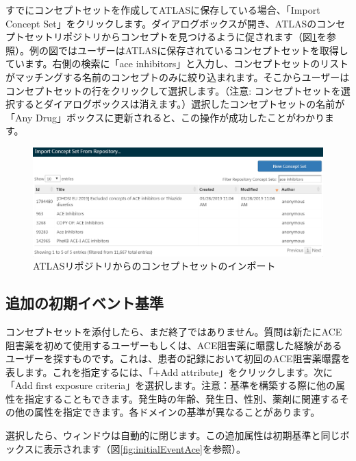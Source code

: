 \documentclass[
  11pt]{book}
\theoremstyle{definition}
\theoremstyle{definition}
\theoremstyle{definition}
\theoremstyle{definition}
\theoremstyle{remark}
\begin{document}
すでにコンセプトセットを作成してATLASに保存している場合、「Import Concept Set」をクリックします。ダイアログボックスが開き、ATLASのコンセプトセットリポジトリからコンセプトを見つけるように促されます（図\ref{fig:ATLASfindyourconcept}を参照）。例の図ではユーザーはATLASに保存されているコンセプトセットを取得しています。右側の検索に「ace inhibitors」と入力し、コンセプトセットのリストがマッチングする名前のコンセプトのみに絞り込まれます。そこからユーザーはコンセプトセットの行をクリックして選択します。（注意: コンセプトセットを選択するとダイアログボックスは消えます。）選択したコンセプトセットの名前が「Any Drug」ボックスに更新されると、この操作が成功したことがわかります。

\begin{figure}

{\centering \includegraphics[width=1\linewidth]{images/Cohorts/ATLAS-findingyourconcept} 

}

\caption{ATLASリポジトリからのコンセプトセットのインポート}\label{fig:ATLASfindyourconcept}
\end{figure}

\subsection{追加の初期イベント基準}\label{ux8ffdux52a0ux306eux521dux671fux30a4ux30d9ux30f3ux30c8ux57faux6e96}

コンセプトセットを添付したら、まだ終了ではありません。質問は新たにACE阻害薬を初めて使用するユーザーもしくは、ACE阻害薬に曝露した経験があるユーザーを探すものです。これは、患者の記録において初回のACE阻害薬曝露を表します。これを指定するには、「+Add attribute」をクリックします。次に「Add first exposure criteria」を選択します。注意：基準を構築する際に他の属性を指定することもできます。発生時の年齢、発生日、性別、薬剤に関連するその他の属性を指定できます。各ドメインの基準が異なることがあります。

選択したら、ウィンドウは自動的に閉じます。この追加属性は初期基準と同じボックスに表示されます（図\ref{fig:initialEventAce}を参照）。
\end{document}
